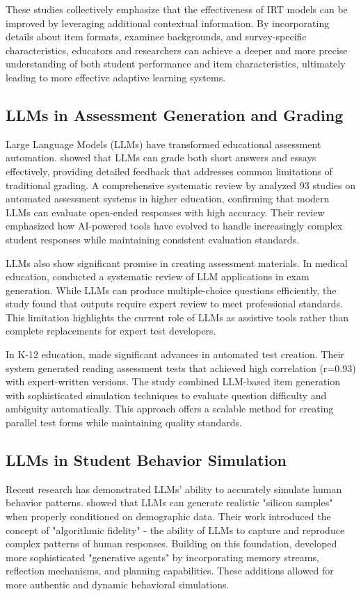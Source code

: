 \documentclass[
    a4paper, %
    10pt, %
    twoside, %
]{LTJournalArticle}
\begin{document}
These studies collectively emphasize that the effectiveness of IRT models can be improved by leveraging additional contextual information. By incorporating details about item formats, examinee backgrounds, and survey-specific characteristics, educators and researchers can achieve a deeper and more precise understanding of both student performance and item characteristics, ultimately leading to more effective adaptive learning systems.

\subsection{LLMs in Assessment Generation and Grading}
Large Language Models (LLMs) have transformed educational assessment automation. \textcite{fagbohun2024beyond} showed that LLMs can grade both short answers and essays effectively, providing detailed feedback that addresses common limitations of traditional grading. A comprehensive systematic review by \textcite{gao2023automatic} analyzed 93 studies on automated assessment systems in higher education, confirming that modern LLMs can evaluate open-ended responses with high accuracy. Their review emphasized how AI-powered tools have evolved to handle increasingly complex student responses while maintaining consistent evaluation standards.

LLMs also show significant promise in creating assessment materials. In medical education, \textcite{artsi2024large} conducted a systematic review of LLM applications in exam generation. While LLMs can produce multiple-choice questions efficiently, the study found that outputs require expert review to meet professional standards. This limitation highlights the current role of LLMs as assistive tools rather than complete replacements for expert test developers.

In K-12 education, \textcite{zelikman2023generating} made significant advances in automated test creation. Their system generated reading assessment tests that achieved high correlation (r=0.93) with expert-written versions. The study combined LLM-based item generation with sophisticated simulation techniques to evaluate question difficulty and ambiguity automatically. This approach offers a scalable method for creating parallel test forms while maintaining quality standards.

\subsection{LLMs in Student Behavior Simulation} 
Recent research has demonstrated LLMs' ability to accurately simulate human behavior patterns. \textcite{argyle2022out} showed that LLMs can generate realistic "silicon samples" when properly conditioned on demographic data. Their work introduced the concept of "algorithmic fidelity" - the ability of LLMs to capture and reproduce complex patterns of human responses. Building on this foundation, \textcite{park2023generative} developed more sophisticated "generative agents" by incorporating memory streams, reflection mechanisms, and planning capabilities. These additions allowed for more authentic and dynamic behavioral simulations.
\end{document}
